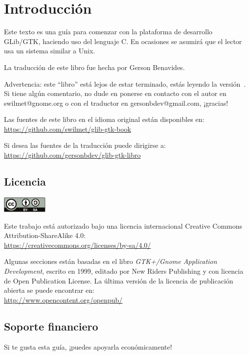 \chapter{Introducción}

Este texto es una guía para comenzar con la plataforma de desarrollo GLib/GTK, haciendo uso del lenguaje C. En ocasiones se asumirá que el lector usa un sistema similar a Unix.

La traducción de este libro fue hecha por Gerson Benavides.

Advertencia: este “libro” está lejos de estar terminado, estás leyendo la versión~\bookversion. Si tiene algún comentario, no dude en ponerse en contacto con el autor en swilmet@gnome.org o con el traductor en gersonbdev@gmail.com, ¡gracias!

Las fuentes de este libro en el idioma original están disponibles en:\\
\url{https://github.com/swilmet/glib-gtk-book}

Si desea las fuentes de la traducción puede dirigirse a:\\
\url{https://github.com/gersonbdev/glib-gtk-libro}

\section{Licencia}
\label{intro-license}

\begin{center}
    \includegraphics[height=0.8cm]{assets/img/creative-commons.pdf}
\end{center}

Este trabajo está autorizado bajo una licencia internacional Creative Commons Attribution-ShareAlike 4.0:\\
\url{https://creativecommons.org/licenses/by-sa/4.0/}

Algunas secciones están basadas en el libro \emph{GTK+/Gnome Application Development}, escrito en 1999, editado por New Riders Publishing y con licencia de Open Publication License. La última versión de la licencia de publicación abierta se puede encontrar en:\\
\url{http://www.opencontent.org/openpub/}

\section{Soporte financiero}
Si te gusta esta guía, ¡puedes apoyarla económicamente!

